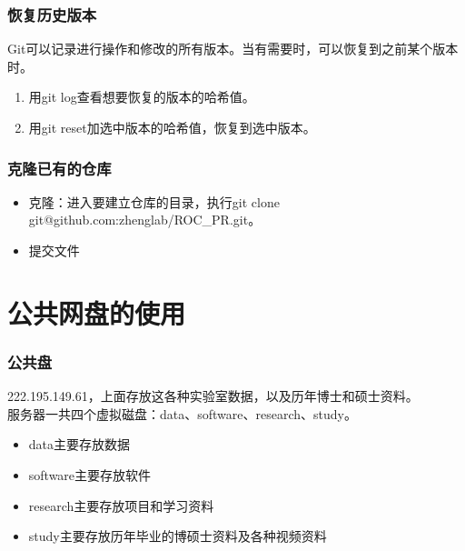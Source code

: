 \documentclass[notheorems,mathserif,table,compress]{beamer}  %
\begin{document}
\begin{frame}
\frametitle{恢复历史版本}
Git可以记录进行操作和修改的所有版本。当有需要时，可以恢复到之前某个版本时。\\
\begin{enumerate}
\item 用git log查看想要恢复的版本的哈希值。\\
\item 用git reset加选中版本的哈希值，恢复到选中版本。\\
\end{enumerate} 
\end{frame}

\begin{frame}
\frametitle{克隆已有的仓库}
\begin{itemize}
\item 克隆：进入要建立仓库的目录，执行git clone git@github.com:zhenglab/ROC\_PR.git。
\item 提交文件
\end{itemize} 
\end{frame} 

\section{公共网盘的使用}

\begin{frame}
\frametitle{公共盘}
222.195.149.61，上面存放这各种实验室数据，以及历年博士和硕士资料。\\
服务器一共四个虚拟磁盘：data、software、research、study。\\
\begin{itemize}
\item data主要存放数据
\item software主要存放软件
\item research主要存放项目和学习资料
\item study主要存放历年毕业的博硕士资料及各种视频资料
\end{itemize}
\end{frame}
\end{document}
